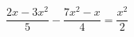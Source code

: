 \begin{ex}[type=equation]
	\begin{condition}
		\( \dfrac{2x-3x^2}{5}-\dfrac{7x^2-x}{4}=\dfrac{x^2}{2} \)
	\end{condition}
\end{ex}